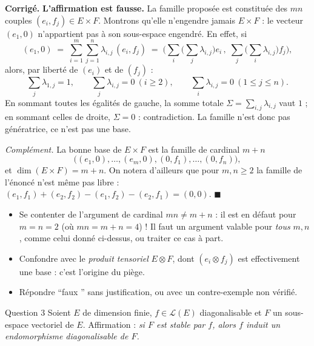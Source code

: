 \documentclass[11pt,a4paper]{article}
\newenvironment{corrige}
  {\par\medskip\noindent
   \begin{tcolorbox}[blanker, breakable,
     borderline west={2.5pt}{0pt}{vertP},
     left=10pt, top=2pt, bottom=2pt]
   {\color{vertP}\bfseries Corrigé.}\hspace{0.5em}\ignorespaces}
  {\hfill$\blacksquare$\end{tcolorbox}\medskip}
\newcommand{\og}{``}
\newcommand{\fg}{''}
\begin{document}
\begin{corrige}
\textbf{L'affirmation est fausse.}
La famille proposée est constituée des $mn$ couples
$(e_i,f_j)\in E\times F$. Montrons qu'elle n'engendre jamais
$E\times F$ : le vecteur $(e_1,0)$ n'appartient pas à son sous-espace
engendré. En effet, si
\[
(e_1,0)\;=\;\sum_{i=1}^{m}\sum_{j=1}^{n}\lambda_{i,j}\,(e_i,f_j)
\;=\;\Big(\sum_{i}\big(\textstyle\sum_{j}\lambda_{i,j}\big)e_i\,,\;
\sum_{j}\big(\textstyle\sum_{i}\lambda_{i,j}\big)f_j\Big),
\]
alors, par liberté de $(e_i)$ et de $(f_j)$ :
\[
\sum_{j}\lambda_{1,j}=1,\qquad
\sum_{j}\lambda_{i,j}=0\ (i\ge 2),\qquad
\sum_{i}\lambda_{i,j}=0\ (1\le j\le n).
\]
En sommant toutes les égalités de gauche, la somme totale
$\Sigma=\sum_{i,j}\lambda_{i,j}$ vaut $1$ ; en sommant celles de
droite, $\Sigma=0$ : contradiction. La famille n'est donc pas
génératrice, ce n'est pas une base.

\emph{Complément.} La bonne base de $E\times F$ est la famille de
cardinal $m+n$
\[
\big((e_1,0),\dots,(e_m,0),(0,f_1),\dots,(0,f_n)\big),
\]
et $\dim(E\times F)=m+n$. On notera d'ailleurs que pour $m,n\ge 2$
la famille de l'énoncé n'est même pas libre :
$(e_1,f_1)+(e_2,f_2)-(e_1,f_2)-(e_2,f_1)=(0,0)$.
\end{corrige}

\begin{pieges}
\begin{itemize}[leftmargin=1.4em, itemsep=2pt]
\item Se contenter de l'argument de cardinal $mn\neq m+n$ : il est en
défaut pour $m=n=2$ (où $mn=m+n=4$) ! Il faut un argument valable
pour \emph{tous} $m,n$, comme celui donné ci-dessus, ou traiter ce
cas à part.
\item Confondre avec le \emph{produit tensoriel} $E\otimes F$, dont
$(e_i\otimes f_j)$ est effectivement une base : c'est l'origine du
piège.
\item Répondre \og faux \fg{} sans justification, ou avec un
contre-exemple non vérifié.
\end{itemize}
\end{pieges}

\begin{enonce}{Question 3}
Soient $E$ de dimension finie, $f\in\mathcal{L}(E)$ diagonalisable et
$F$ un sous-espace vectoriel de $E$.
Affirmation : \emph{si $F$ est stable par $f$, alors $f$ induit un
endomorphisme diagonalisable de $F$.}
\end{enonce}
\end{document}
